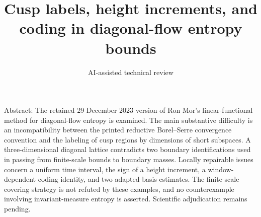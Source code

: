 \documentclass[10pt]{article}
\title{Cusp labels, height increments, and coding in diagonal-flow entropy bounds}
\author{AI-assisted technical review}
\date{}
\begin{document}
\maketitle
Abstract: The retained 29 December 2023 version of Ron Mor’s linear-functional method for diagonal-flow entropy is examined. The main substantive difficulty is an incompatibility between the printed reductive Borel–Serre convergence convention and the labeling of cusp regions by dimensions of short subspaces. A three-dimensional diagonal lattice contradicts two boundary identifications used in passing from finite-scale bounds to boundary masses. Locally repairable issues concern a uniform time interval, the sign of a height increment, a window-dependent coding identity, and two adapted-basis estimates. The finite-scale covering strategy is not refuted by these examples, and no counterexample involving invariant-measure entropy is asserted. Scientific adjudication remains pending.\par
\end{document}

